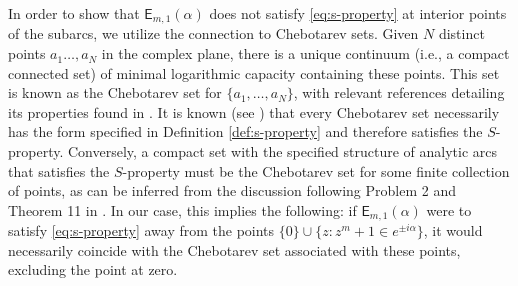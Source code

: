 \documentclass[12pt,oneside,reqno]{amsart}
\theoremstyle{definition}
\numberwithin{equation}{section}
\newcommand{\E}{{\mathsf E}}
\begin{document}
In order to show that $\E_{m,1}(\alpha)$ does not satisfy \eqref{eq:s-property} at interior points of the subarcs, we utilize the connection to Chebotarev sets. Given $N$ distinct points $a_1\dotsc,a_N$ in the complex plane, there is a unique continuum (i.e., a compact connected set) of minimal logarithmic capacity containing these points. This set is known as the Chebotarev set for $\{a_1,\ldots,a_N\}$, with relevant references detailing its properties found in \cite{stahl12, grotzsch30, schiefermayr14, schiefermayr15, kuzmina80, fedorov85, martinez-finkelshtein-rakhmanov11, ortega-cerda-pridhnani08}. 
It is known (see \cite{stahl12}) that every Chebotarev set necessarily has the form specified in Definition \ref{def:s-property} and therefore satisfies the $S$-property. Conversely, a compact set with the specified structure of analytic arcs that satisfies the $S$-property must be the Chebotarev set for some finite collection of points, as can be inferred from the discussion following Problem 2 and Theorem 11 in \cite{stahl12}.
In our case, this implies the following: if $\E_{m,1}(\alpha)$ were to satisfy \eqref{eq:s-property} away from the points \(\{0\}\cup\{z: z^m+1\in e^{\pm i \alpha}\}\), it would necessarily coincide with the Chebotarev set associated with these points, excluding the point at zero.
\end{document}

